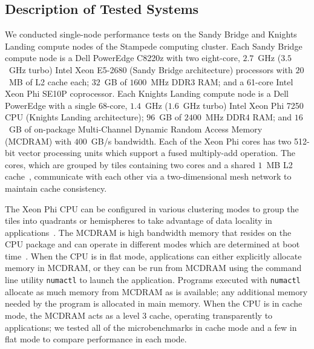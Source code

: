 \subsection{Description of Tested Systems}
We conducted single-node performance tests on the Sandy Bridge and Knights
  Landing compute nodes of the Stampede computing cluster.
Each Sandy Bridge compute node is a Dell PowerEdge C8220z with two eight-core,
  $2.7$~GHz ($3.5$~GHz turbo) Intel Xeon E5-2680 (Sandy Bridge architecture)
  processors with $20$~MB of L2 cache each; $32$~GB of $1600$~MHz DDR3 RAM; and
  a 61-core Intel Xeon Phi SE10P coprocessor.
Each Knights Landing compute node is a Dell PowerEdge with a single 68-core,
  $1.4$~GHz ($1.6$~GHz turbo) Intel Xeon Phi 7250 CPU (Knights Landing
  architecture); $96$~GB of $2400$~MHz DDR4 RAM;
  and $16$~GB of on-package Multi-Channel Dynamic Random Access Memory (MCDRAM)
  with $400$~GB/s bandwidth.
Each of the Xeon Phi cores has two 512-bit vector processing units which
  support a fused multiply-add operation.
The cores, which are grouped by tiles containing two cores and a shared
  $1$~MB L2 cache~\cite{intel:xeonphi}, communicate with each other via a
  two-dimensional mesh network to maintain cache consistency.

The Xeon Phi CPU can be configured in various clustering modes to group the
  tiles into quadrants or hemispheres to take advantage of data locality in
  applications~\cite{vladimirov:knlModes}.
The MCDRAM is high bandwidth memory that resides on the CPU package and can
  operate in different modes which are determined at boot
  time~\cite{vladimirov:knlModes, asai:mcdramKnl}.
When the CPU is in flat mode, applications can either explicitly allocate memory
  in MCDRAM, or they can be run from MCDRAM using the command line utility
  \texttt{numactl} to launch the application.
Programs executed with \texttt{numactl} allocate as much memory from
  MCDRAM as is available; any additional memory needed by the program is
  allocated in main memory.
When the CPU is in cache mode, the MCDRAM acts as a level 3 cache, operating
  transparently to applications; we tested all of the microbenchmarks in
  cache mode and a few in flat mode to compare performance in each mode.

